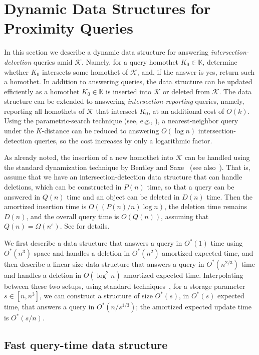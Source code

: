 \documentclass[11pt]{article}
\def\Kspace{{\mathbb K}}
\def\eps{{\varepsilon}}
\def\K{\mathcal{K}}
\theoremstyle{definition}
\begin{document}
\section{Dynamic Data Structures for Proximity Queries} \label{sec:ds}

In this section we describe a dynamic data structure for answering \emph{intersection-detection}
queries amid $\K$. Namely, for a query homothet $K_0 \in \Kspace$, determine whether $K_0$ intersects
some homothet of $\K$, and, if the answer is yes, return such a homothet.
In addition to answering queries, the data structure can be updated efficiently
as a homothet $K_0\in\Kspace$ is inserted into $\K$ or deleted from $\K$. 
The data structure can be extended to answering \emph{intersection-reporting} queries, namely,
reporting all homothets of $\K$ that intersect $K_0$, at an additional cost of $O(k)$. 
\iffullver
Using the parametric-search technique
(see, e.g., \cite{AM93,AM95}), a nearest-neighbor query under the $K$-distance can be reduced 
to answering $O(\log n)$ intersection-detection queries, so the cost increases by only a logarithmic factor.
\fi

As already noted, the insertion of a new homothet into $\K$ can be handled using the standard 
dynamization technique by Bentley and Saxe~\cite{BS80} (see also~\cite{AM95}).
That is, assume that we have an intersection-detection data structure that can handle deletions,
which can be constructed in $P(n)$ time, so that a query can be answered in $Q(n)$ time and an object can be deleted in $D(n)$ time.
Then the amortized insertion time is $O((P(n)/n)\log n)$, the deletion time remains $D(n)$, 
and the overall query time is $O(Q(n))$, assuming that $Q(n) = \Omega(n^\eps)$.
\iffullver
See \cite{BS80} for details.
\fi

We first describe a data structure that answers a query in $O^*(1)$ time using
$O^*(n^3)$ space and handles a deletion in $O^*(n^2)$ amortized expected time, and then describe a linear-size data 
structure that answers a query in $O^*(n^{2/3})$ time and handles a deletion in $O(\log^2 n)$ amortized expected time. 
\iffullver
Interpolating between these two setups, using standard techniques~\cite{AAEKS}, 
for a storage parameter $s\in [n,n^3]$, 
we can construct a structure of size $O^*(s)$, in $O^*(s)$ expected time,
that answers a query in $O^*(n/s^{1/3})$;
the amortized expected update time is $O^*(s/n)$.
\fi

\subsection{Fast query-time data structure}
\label{subsec:log}
\end{document}
